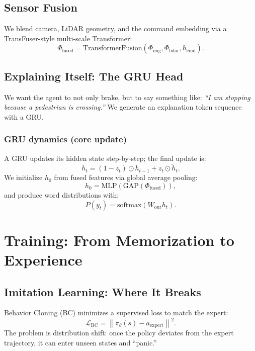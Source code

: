 \documentclass[11pt]{article}
\begin{document}
\subsection{Sensor Fusion}

We blend camera, LiDAR geometry, and the command embedding via a TransFuser-style multi-scale Transformer:
\begin{equation}
\Phi_{\text{fused}}=\mathrm{TransformerFusion}(\Phi_{\text{img}}, \Phi_{\text{lidar}}, h_{\text{cmd}}).
\end{equation}

\subsection{Explaining Itself: The GRU Head}

We want the agent to not only brake, but to say something like:
\emph{``I am stopping because a pedestrian is crossing.''}
We generate an explanation token sequence with a GRU.

\subsubsection{GRU dynamics (core update)}
A GRU updates its hidden state step-by-step; the final update is:
\begin{equation}
h_t=(1-z_t)\odot h_{t-1}+z_t\odot \tilde{h}_t.
\end{equation}
We initialize $h_0$ from fused features via global average pooling:
\[
h_0 = \mathrm{MLP}\!\left(\mathrm{GAP}(\Phi_{\text{fused}})\right),
\]
and produce word distributions with:
\[
P(y_t)=\mathrm{softmax}(W_{\text{out}}h_t).
\]

\section{Training: From Memorization to Experience}

\subsection{Imitation Learning: Where It Breaks}
Behavior Cloning (BC) minimizes a supervised loss to match the expert:
\begin{equation}
\mathcal{L}_{\text{BC}}=\left\|\pi_\theta(s)-a_{\text{expert}}\right\|^2.
\end{equation}
The problem is distribution shift: once the policy deviates from the expert trajectory, it can enter unseen states and ``panic.''
\end{document}
